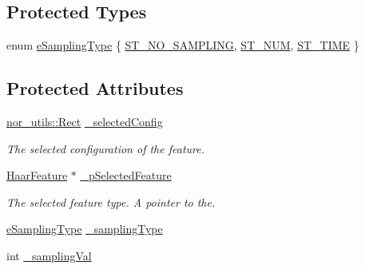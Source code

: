 \subsection*{Protected Types}
\begin{DoxyCompactItemize}
\item 
enum \hyperlink{classMultiBoost_1_1HaarLearner_adf0e32ac3343991b3bdd302ba8cc0696}{eSamplingType} \{ \hyperlink{classMultiBoost_1_1HaarLearner_adf0e32ac3343991b3bdd302ba8cc0696a2a74732a5d05064447d1fdb5cc7409c0}{ST\_\-NO\_\-SAMPLING}, 
\hyperlink{classMultiBoost_1_1HaarLearner_adf0e32ac3343991b3bdd302ba8cc0696ac2c6fa2572b28e92f2102d8588517d55}{ST\_\-NUM}, 
\hyperlink{classMultiBoost_1_1HaarLearner_adf0e32ac3343991b3bdd302ba8cc0696a46a18d520e35d646bda098f409697fb6}{ST\_\-TIME}
 \}
\end{DoxyCompactItemize}
\subsection*{Protected Attributes}
\begin{DoxyCompactItemize}
\item 
\hypertarget{classMultiBoost_1_1HaarLearner_a92f1707bb6495029299cd500d50f741a}{
\hyperlink{structnor__utils_1_1Rect}{nor\_\-utils::Rect} \hyperlink{classMultiBoost_1_1HaarLearner_a92f1707bb6495029299cd500d50f741a}{\_\-selectedConfig}}
\label{classMultiBoost_1_1HaarLearner_a92f1707bb6495029299cd500d50f741a}

\begin{DoxyCompactList}\small\item\em The selected configuration of the feature. \end{DoxyCompactList}\item 
\hyperlink{classMultiBoost_1_1HaarFeature}{HaarFeature} $\ast$ \hyperlink{classMultiBoost_1_1HaarLearner_a839d58f0936493fc3b1e06d531eaf4e0}{\_\-pSelectedFeature}
\begin{DoxyCompactList}\small\item\em The selected feature type. A pointer to the. \end{DoxyCompactList}\item 
\hyperlink{classMultiBoost_1_1HaarLearner_adf0e32ac3343991b3bdd302ba8cc0696}{eSamplingType} \hyperlink{classMultiBoost_1_1HaarLearner_adc82d4cecfc91b8163ec07fc627edb27}{\_\-samplingType}
\item 
int \hyperlink{classMultiBoost_1_1HaarLearner_a2f122e9eaa6c009cc722ff32ad1642c0}{\_\-samplingVal}
\end{DoxyCompactItemize}


